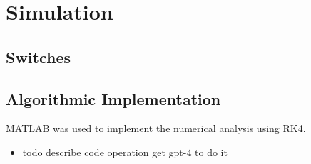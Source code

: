 \section{Simulation}
\subsection{Switches}
\subsection{Algorithmic Implementation}
MATLAB was used to implement the numerical analysis using RK4.
\begin{itemize}
	\item todo describe code operation get gpt-4 to do it
\end{itemize}
